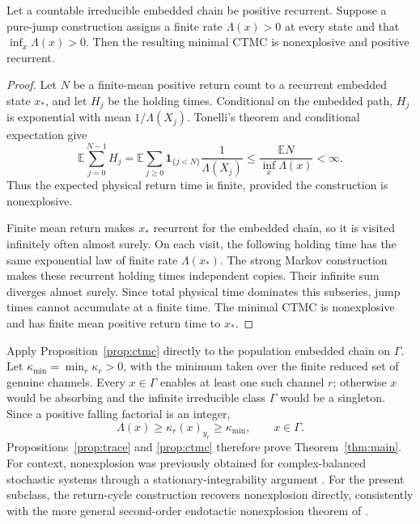 \begin{proposition}\label{prop:ctmc}
Let a countable irreducible embedded chain be positive recurrent.  Suppose a
pure-jump construction assigns a finite rate \(\Lambda(x)>0\) at every state
and that \(\inf_x\Lambda(x)>0\).  Then the resulting minimal CTMC is
nonexplosive and positive recurrent.
\end{proposition}

\begin{proof}
Let \(N\) be a finite-mean positive return count to a recurrent embedded state
\(x_*\), and let \(H_j\) be the holding times.  Conditional on the embedded
path, \(H_j\) is exponential with mean \(1/\Lambda(X_j)\).  Tonelli's theorem
and conditional expectation give
\[
 \mathbb E\sum_{j=0}^{N-1}H_j
 =\mathbb E\sum_{j\ge0}\mathbf1_{\{j<N\}}
   \frac1{\Lambda(X_j)}
 \le\frac{\mathbb EN}{\inf_x\Lambda(x)}<\infty.
\]
Thus the expected physical return time is finite, provided the construction
is nonexplosive.

Finite mean return makes \(x_*\) recurrent for the embedded chain, so it is
visited infinitely often almost surely.  On each visit, the following
holding time has the same exponential law of finite rate \(\Lambda(x_*)\).
The strong Markov construction makes these recurrent holding times
independent copies.  Their infinite sum diverges almost surely.  Since total
physical time dominates this subseries, jump times cannot accumulate at a
finite time.  The minimal CTMC is nonexplosive and has finite mean positive
return time to \(x_*\).
\end{proof}

Apply Proposition~\ref{prop:ctmc} directly to the population embedded chain on
\(\Gamma\).  Let \(\kappa_{\min}=\min_r\kappa_r>0\), with the minimum taken
over the finite reduced set of genuine channels.  Every \(x\in\Gamma\) enables
at least one such channel \(r\); otherwise \(x\) would be absorbing and the
infinite irreducible class \(\Gamma\) would be a singleton.  Since a positive
falling factorial is an integer,
\begin{equation}\label{eq:rate-lower}
  \Lambda(x)\ge\kappa_r(x)_{y_r}\ge\kappa_{\min},
  \qquad x\in\Gamma.
\end{equation}
Propositions~\ref{prop:trace} and \ref{prop:ctmc} therefore prove
Theorem~\ref{thm:main}.  For context, nonexplosion was previously obtained for
complex-balanced stochastic systems through a stationary-integrability
argument \citep{AndersonCappellettiKoyamaKurtz2018}.  For the present subclass,
the return-cycle construction recovers nonexplosion directly, consistently
with the more general second-order endotactic nonexplosion theorem of
\citet{Xu2026}.

